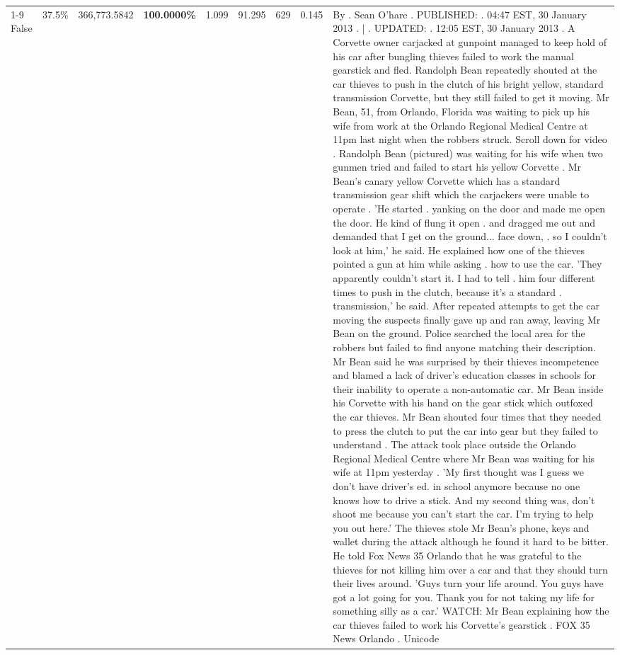 \begin{table}[H]
\begin{tabular}{lllrlllll}
\cline{1-9} \cline{2-9}
False & 37.5\% & 366,773.5842 & \bfseries \color{red} 100.0000\% & 1.099 & 91.295 & 629 & 0.145 & By . Sean O'hare . PUBLISHED: . 04:47 EST, 30 January 2013 . | . UPDATED: . 12:05 EST, 30 January 2013 . A Corvette owner carjacked at gunpoint managed to keep hold of his car after bungling thieves failed to work the manual gearstick and fled. Randolph Bean repeatedly shouted at the car thieves to push in the clutch of his bright yellow, standard transmission Corvette, but they still failed to get it moving. Mr Bean, 51, from Orlando, Florida was waiting to pick up his wife from work at the Orlando Regional Medical Centre at 11pm last night when the robbers struck. Scroll down for video . Randolph Bean (pictured) was waiting for his wife when two gunmen tried and failed to start his yellow Corvette . Mr Bean's canary yellow Corvette which has a standard transmission gear shift which the carjackers were unable to operate . 'He started . yanking on the door and made me open the door. He kind of flung it open . and dragged me out and demanded that I get on the ground... face down, . so I couldn't look at him,' he said. He explained how one of the thieves pointed a gun at him while asking . how to use the car. 'They apparently couldn't start it. I had to tell . him four different times to push in the clutch, because it's a standard . transmission,' he said. After repeated attempts to get the car moving the suspects finally gave up and ran away, leaving Mr Bean on the ground. Police searched the local area for the robbers but failed to find anyone matching their description. Mr Bean said he was surprised by their thieves incompetence and blamed a lack of driver's education classes in schools for their inability to operate a non-automatic car. Mr Bean inside his Corvette with his hand on the gear stick which outfoxed the car thieves. Mr Bean shouted four times that they needed to press the clutch to put the car into gear but they failed to understand . The attack took place outside the Orlando Regional Medical Centre where Mr Bean was waiting for his wife at 11pm yesterday . 'My first thought was I guess we don't have driver's ed. in school anymore because no one knows how to drive a stick. And my second thing was, don't shoot me because you can't start the car. I'm trying to help you out here.' The thieves stole Mr Bean's phone, keys and wallet during the attack although he found it hard to be bitter. He told Fox News 35 Orlando that he was grateful to the thieves for not killing him over a car and that they should turn their lives around. 'Guys turn your life around. You guys have got a lot going for you. Thank you for not taking my life for something silly as a car.' WATCH: Mr Bean explaining how the car thieves failed to work his Corvette's gearstick . FOX 35 News Orlando . Unicode \\

\end{tabular}
\end{table}
